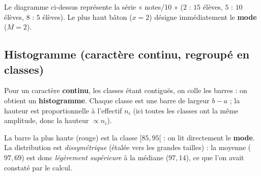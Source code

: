 \documentclass[11pt,a4paper]{article}
\begin{document}
\begin{exemple}
Le diagramme ci-dessus représente la série « notes/10 » ($2$ : $15$ élèves, $5$ : $10$ élèves,
$8$ : $5$ élèves). Le plus haut bâton ($x=2$) désigne immédiatement le \textbf{mode} ($M=2$).
\end{exemple}

\subsection{Histogramme (caractère continu, regroupé en classes)}

Pour un caractère \textbf{continu}, les classes étant contiguës, on colle les barres : on obtient un
\textbf{histogramme}. Chaque classe est une barre de largeur $b-a$ ; la hauteur est proportionnelle
à l'effectif $n_i$ (ici toutes les classes ont la même amplitude, donc la hauteur $\propto n_i$).

\begin{center}
\end{center}

\begin{exemple}
La barre la plus haute (rouge) est la classe $[85,95[$ : on lit directement le \textbf{mode}. La
distribution est \emph{dissymétrique} (étalée vers les grandes tailles) : la moyenne ($97{,}69$) est
donc \emph{légèrement supérieure} à la médiane ($97{,}14$), ce que l'on avait constaté par le calcul.
\end{exemple}
\end{document}
